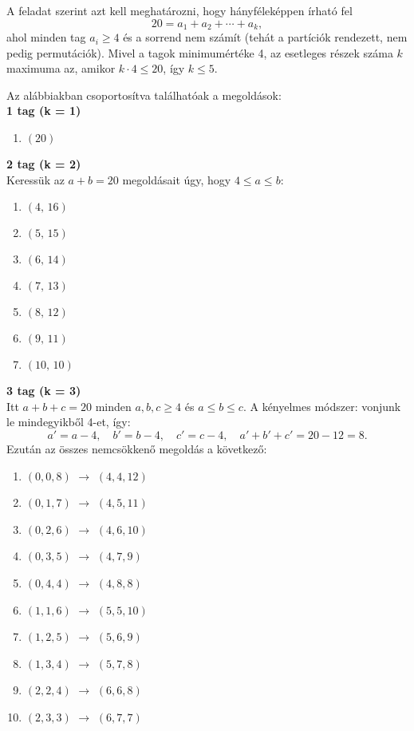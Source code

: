 \begin{solution}
A feladat szerint azt kell meghatározni, hogy hányféleképpen írható
fel 
\[
20=a_{1}+a_{2}+\cdots+a_{k},
\]
ahol minden tag $a_{i}\ge4$ és a sorrend nem számít (tehát a partíciók
rendezett, nem pedig permutációk). Mivel a tagok minimumértéke 4,
az esetleges részek száma $k$ maximuma az, amikor $k\cdot4\le20$,
így $k\le5$.

Az alábbiakban csoportosítva találhatóak a megoldások: \\
\textbf{ 1 tag (k = 1)}\\
 
\begin{enumerate}
[label=(\alph*)]
\item $(20)$ 
\end{enumerate}
\textbf{2 tag (k = 2)}\\
 Keressük az $a+b=20$ megoldásait úgy, hogy $4\le a\le b$: 
\begin{enumerate}
[label=(\alph*)]
\item $(4,\,16)$ 
\item $(5,\,15)$ 
\item $(6,\,14)$ 
\item $(7,\,13)$ 
\item $(8,\,12)$ 
\item $(9,\,11)$ 
\item $(10,\,10)$ 
\end{enumerate}
\textbf{3 tag (k = 3)}\\
 Itt $a+b+c=20$ minden $a,b,c\ge4$ és $a\le b\le c$. A kényelmes
módszer: vonjunk le mindegyikből 4-et, így: 
\[
a'=a-4,\quad b'=b-4,\quad c'=c-4,\quad a'+b'+c'=20-12=8.
\]
Ezután az összes nemcsökkenő megoldás a következő: 
\begin{enumerate}
[label=(\alph*)]
\item $(0,0,8)$ $\to$ $(4,4,12)$ 
\item $(0,1,7)$ $\to$ $(4,5,11)$ 
\item $(0,2,6)$ $\to$ $(4,6,10)$ 
\item $(0,3,5)$ $\to$ $(4,7,9)$ 
\item $(0,4,4)$ $\to$ $(4,8,8)$ 
\item $(1,1,6)$ $\to$ $(5,5,10)$ 
\item $(1,2,5)$ $\to$ $(5,6,9)$ 
\item $(1,3,4)$ $\to$ $(5,7,8)$ 
\item $(2,2,4)$ $\to$ $(6,6,8)$ 
\item $(2,3,3)$ $\to$ $(6,7,7)$ 
\end{enumerate}

\end{solution}
